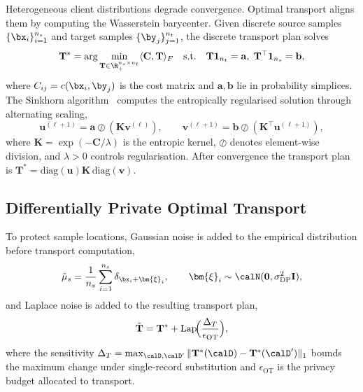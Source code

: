 Heterogeneous client distributions degrade convergence. Optimal transport aligns them by computing the Wasserstein barycenter. Given discrete source samples $\{\bx_i\}_{i=1}^{n_s}$ and target samples $\{\by_j\}_{j=1}^{n_t}$, the discrete transport plan solves
\begin{equation}
\mathbf{T}^* = \arg\min_{\mathbf{T}\in\R_+^{n_s\times n_t}}
\langle\mathbf{C},\mathbf{T}\rangle_F
\quad\text{s.t.}\quad
\mathbf{T}\mathbf{1}_{n_t}=\mathbf{a},\;
\mathbf{T}^\top\mathbf{1}_{n_s}=\mathbf{b},
\label{eq:fed_ot}
\end{equation}
where $C_{ij}=c(\bx_i,\by_j)$ is the cost matrix and $\mathbf{a},\mathbf{b}$ lie in probability simplices. The Sinkhorn algorithm~\cite{Cuturi2013,Chizat2020,Villani2009} computes the entropically regularised solution through alternating scaling,
\begin{equation}
\mathbf{u}^{(\ell+1)} = \mathbf{a}\oslash(\mathbf{K}\mathbf{v}^{(\ell)}),
\qquad
\mathbf{v}^{(\ell+1)} = \mathbf{b}\oslash(\mathbf{K}^\top\mathbf{u}^{(\ell+1)}),
\label{eq:sinkhorn}
\end{equation}
where $\mathbf{K}=\exp(-\mathbf{C}/\lambda)$ is the entropic kernel, $\oslash$ denotes element-wise division, and $\lambda>0$ controls regularisation. After convergence the transport plan is $\mathbf{T}^*=\mathrm{diag}(\mathbf{u})\mathbf{K}\,\mathrm{diag}(\mathbf{v})$.

\subsection{Differentially Private Optimal Transport}

To protect sample locations, Gaussian noise is added to the empirical distribution before transport computation,
\begin{equation}
\tilde{\mu}_s = \frac{1}{n_s}\sum_{i=1}^{n_s}\delta_{\bx_i+\bm{\xi}_i},
\qquad \bm{\xi}_i\sim\calN(\mathbf{0},\sigma_{\mathrm{DP}}^2\mathbf{I}),
\label{eq:fed_dp_ot_dist}
\end{equation}
and Laplace noise is added to the resulting transport plan,
\begin{equation}
\tilde{\mathbf{T}} = \mathbf{T}^*
+ \mathrm{Lap}\!\Bigl(\frac{\Delta_T}{\epsilon_{\mathrm{OT}}}\Bigr),
\label{eq:fed_dp_ot_plan}
\end{equation}
where the sensitivity $\Delta_T=\max_{\calD,\calD'}\|\mathbf{T}^*(\calD)-\mathbf{T}^*(\calD')\|_1$ bounds the maximum change under single-record substitution and $\epsilon_{\mathrm{OT}}$ is the privacy budget allocated to transport.

